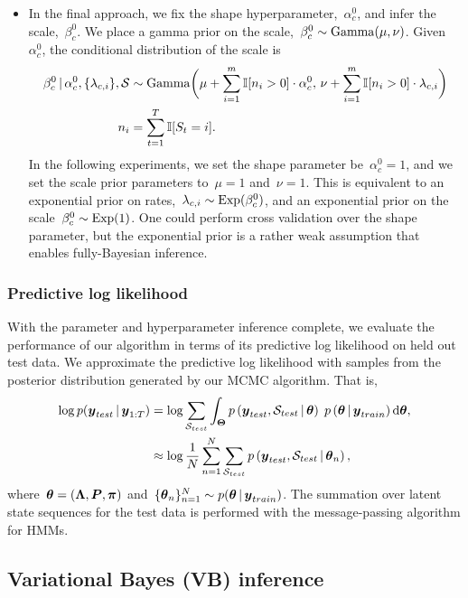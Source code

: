 \begin{itemize}
\item In the final approach, we fix the shape hyperparameter,~$\alpha_c^0$, and infer the scale,~$\beta_c^0$.  We place a gamma prior on the scale,~$\beta_c^0 \sim \mathrm{Gamma}(\mu, \nu)$. Given~$\alpha_c^0$, the conditional distribution of the scale is 
\begin{align}
\beta_c^0 \,|\, \alpha_c^0, \{\lambda_{c,i}\}, \mathcal{S}  &\sim \mathrm{Gamma}\bigg(
\mu + \sum_{i=1}^m \mathbb{I}[n_i > 0] \cdot \alpha_c^0, \,
\nu + \sum_{i=1}^m \mathbb{I}[n_i > 0] \cdot \lambda_{c,i} \bigg) \\
\nonumber n_i &= \sum_{t=1}^T \mathbb{I}[S_t=i].
\end{align}
In the following experiments, we set the shape parameter be~$\alpha_c^0=1$, and we set the scale prior parameters to~$\mu=1$ and~$\nu=1$.  This is equivalent to an exponential prior on rates,~$\lambda_{c,i} \sim \mathrm{Exp}(\beta_c^0)$, and an exponential prior on the scale~$\beta_c^0 \sim \mathrm{Exp}(1)$.
One could perform cross validation over the shape parameter, but the exponential prior is a rather weak assumption that enables fully-Bayesian inference.


\end{itemize}


\subsubsection{Predictive log likelihood}
With the parameter and hyperparameter inference complete, we evaluate the performance of our algorithm in terms of its predictive log likelihood on held out test data. We approximate the predictive log likelihood with samples from the posterior distribution generated by our MCMC algorithm. That is,
\begin{align}
\log p(\boldsymbol{y}_{test} \,|\, \boldsymbol{y}_{1:T}) &= \log \sum_{\mathcal{S}_{test}} \int_{\boldsymbol{\Theta}} p\left(\boldsymbol{y}_{test}, \mathcal{S}_{test} \,|\, \boldsymbol{\theta} \right) \; p\left(\boldsymbol{\theta} \,|\, \boldsymbol{y}_{train} \right) \mathrm{d}\boldsymbol{\theta}, \\
\nonumber &\approx \log \frac{1}{N} \sum_{n=1}^N \sum_{\mathcal{S}_{test}} p\left(\boldsymbol{y}_{test},  \mathcal{S}_{test} \,|\, \boldsymbol{\theta}_n\right),
\end{align}
where~${\boldsymbol{\theta}=(\boldsymbol{\Lambda}, \boldsymbol{P}, \boldsymbol{\pi})}$ and~$\{\boldsymbol{\theta}_n \}_{n=1}^N \sim p(\boldsymbol{\theta} \,|\, \boldsymbol{y}_{train})$. The summation over latent state sequences for the test data is performed with the message-passing algorithm for HMMs.

\subsection{Variational Bayes (VB) inference}



